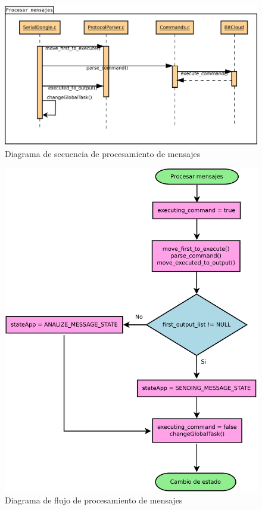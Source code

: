 \begin{figure}
	\centering
	\includegraphics[scale=0.35]{capitulo_3_imgs/procesar_mensajes_secuencia.pdf}
	\caption{Diagrama de secuencia de procesamiento de mensajes}
	\label{fig:diagrama_secuencia_procesamiento}
\end{figure}

\begin{figure}
	\centering
	\includegraphics[scale=0.35]{capitulo_3_imgs/procesar_mensaje_flujo.pdf}
	\caption{Diagrama de flujo de procesamiento de mensajes}
	\label{fig:diagrama_flujo_procesamiento}
\end{figure}

